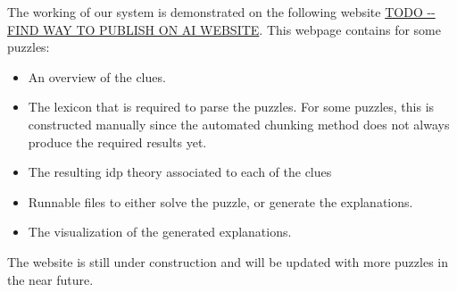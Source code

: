 The working of our system is demonstrated on the following website \url{TODO -- FIND WAY TO PUBLISH ON AI WEBSITE}. This webpage contains for some puzzles: 
\begin{itemize}
 \item An overview of the clues.
 \item The lexicon that is required to parse the puzzles. For some puzzles, this is constructed manually since the automated chunking method does not always produce the required results yet. 
 \item The resulting idp theory associated to each of the clues
 \item Runnable \idp files to either  solve the puzzle, or generate the explanations. 
 \item The visualization of the generated explanations. 
\end{itemize}
The website is still under construction and will be updated with more puzzles in the near future. 
